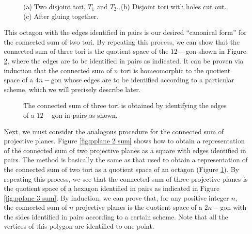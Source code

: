 \documentclass{article}
\theoremstyle{definition}
\begin{document}
\begin{figure}[htb]
  \centering
  \begin{subfigure}{\linewidth}
    \begin{center}
      
    \end{center}
    \caption{}
  \end{subfigure}
  \begin{subfigure}{\linewidth}
    \begin{center}
      
    \end{center}
    \caption{}
  \end{subfigure}
  \begin{subfigure}{\linewidth}
    \begin{center}
      
    \end{center}
    \caption{}
  \end{subfigure}
  \caption{(a) Two disjoint tori, $T_1$ and $T_2.$ (b) Disjoint tori with holes cut out. (c) After gluing together.}
  \label{fig:tori 2 sum}
\end{figure}

\newpage
This octagon with the edges identified in pairs is our desired ``canonical form'' for the connected sum of two tori. By repeating this process, we can show that the connected sum of three tori is the quotient space of the $12-$gon shown in Figure \ref{fig:tori 3 sum}, where the edges are to be identified in pairs as indicated. It can be proven via induction that the connected sum of $n$ tori is homeomorphic to the quotient space of a $4n-$gon whose edges are to be identified according to a particular scheme, which we will precisely describe later.

\begin{figure}[htb]
  \centering
  
  \caption{The connected sum of three tori is obtained by identifying the edges of a $12-$gon in pairs as shown.}
  \label{fig:tori 3 sum}
\end{figure}
Next, we must consider the analogous procedure for the connected sum of projective planes. Figure \ref{fig:pplane 2 sum} shows how to obtain a representation of the connected sum of two projective planes as a square with edges identified in pairs. The method is basically the same as that used to obtain a representation of the connected sum of two tori as a quotient space of an octagon (Figure \ref{fig:tori 2 sum}). By repeating this process, we see that the connected sum of three projective planes is the quotient space of a hexagon identified in pairs as indicated in Figure \ref{fig:pplane 3 sum}. By induction, we can prove that, for any positive integer $n,$ the connected sum of $n$ projective planes is the quotient space of a $2n-$gon with the sides identified in pairs according to a certain scheme. Note that all the vertices of this polygon are identified to one point.
\end{document}
